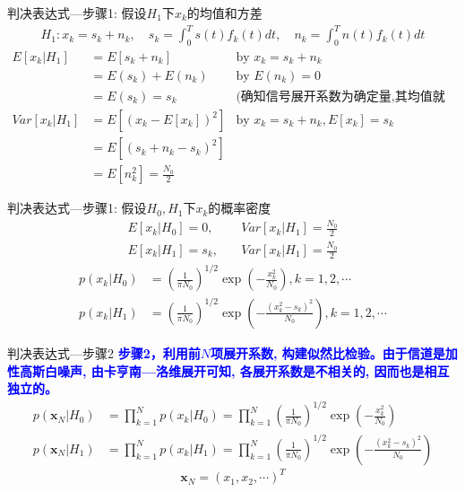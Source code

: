 \begin{frame}[shrink]{判决表达式---步骤1: 假设$H_1$下$x_k$的均值和方差}
\begin{align*}
H_1: x_k=s_k+n_k, \quad s_k=\int_{0}^{T}s(t)f_k(t)dt, \quad n_k=\int_{0}^{T}n(t)f_k(t)dt
\end{align*}
\begin{align*}
E[x_k|H_1]&=E[s_k+n_k]&\text{by }x_k=s_k+n_k \\
&=E(s_k)+E(n_k)&\text{by }E(n_k)=0 \\
&=E(s_k)=s_k&\text{(确知信号展开系数为确定量,其均值就是本身)}\\
Var[x_k|H_1]&=E[(x_k-E[x_k])^2]&\text{by }x_k=s_k+n_k,E[x_k]=s_k\\
&=E[(s_k+n_k-s_k)^2]&\\
&=E[n_k^2]=\frac{N_0}{2}&
\end{align*}
\end{frame}

\begin{frame}[shrink]{判决表达式---步骤1: 假设$H_0,H_1$下$x_k$的概率密度}
\begin{align*}
E[x_k|H_0]=0,   &\quad Var[x_k|H_1]=\frac{N_0}{2}\\
E[x_k|H_1]=s_k, &\quad Var[x_k|H_1]=\frac{N_0}{2}
\end{align*}
\begin{align*}
p(x_k|H_0)&=\left(\frac{1}{\pi N_0}\right)^{1/2}\exp\left(-\frac{x_k^2}{N_0}\right), k=1,2,\cdots\\
p(x_k|H_1)&=\left(\frac{1}{\pi N_0}\right)^{1/2}\exp\left(-\frac{(x_k^2-s_k)^2}{N_0}\right), k=1,2,\cdots
\end{align*}
\end{frame}

\begin{frame}[shrink]{判决表达式---步骤2}
\textbf{\textcolor{blue}{步骤2，利用前$N$项展开系数, 构建似然比检验。由于信道是加性高斯白噪声, 由卡亨南---洛维展开可知, 各展开系数是不相关的, 因而也是相互独立的。}}
\begin{align*}
p(\bm{x}_N|H_0)&=\prod_{k=1}^{N}p(x_k|H_0)=\prod_{k=1}^{N}\left(\frac{1}{\pi N_0}\right)^{1/2}\exp\left(-\frac{x_k^2}{N_0}\right)\\
p(\bm{x}_N|H_1)&=\prod_{k=1}^{N}p(x_k|H_1)=\prod_{k=1}^{N}\left(\frac{1}{\pi N_0}\right)^{1/2}\exp\left(-\frac{(x_k^2-s_k)^2}{N_0}\right)
\end{align*}
\[\bm{x}_N=(x_1,x_2,\cdots)^T\]		
\end{frame}

